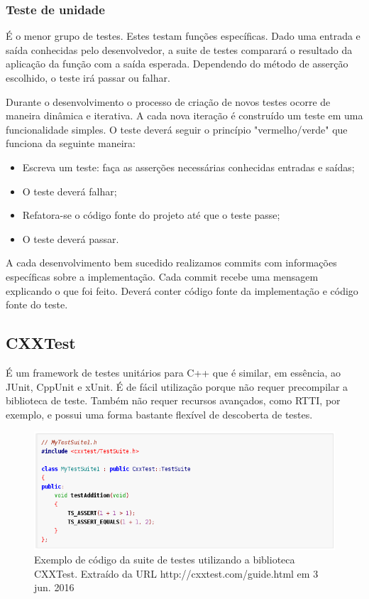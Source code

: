 \documentclass[
	article,			%
	12pt,				%
	oneside,			%
	a4paper,			%
	english,			
	brazil,
	sumario=tradicional
	]{abntex2}
\begin{document}
\subsubsection{Teste de unidade}

É o menor grupo de testes. Estes testam funções específicas. Dado uma entrada e saída conhecidas pelo desenvolvedor, a suite de testes comparará o resultado da aplicação da função com a saída esperada. Dependendo do método de asserção escolhido, o teste irá passar ou falhar.

Durante o desenvolvimento o processo de criação de novos testes ocorre de maneira dinâmica e iterativa. A cada nova iteração é construído um teste em uma funcionalidade simples. 
O teste deverá seguir o princípio "vermelho/verde" que funciona da seguinte maneira:
\begin{itemize}
	\item{Escreva um teste: faça as asserções necessárias conhecidas entradas e saídas;}
	\item{O teste deverá falhar;}	
	\item{Refatora-se o código fonte do projeto até que o teste passe;}
	\item{O teste deverá passar.}
\end{itemize}

A cada desenvolvimento bem sucedido realizamos commits com informações específicas sobre a implementação. Cada commit recebe uma mensagem explicando o que foi feito. Deverá conter código fonte da implementação e código fonte do teste.


\subsection{CXXTest}

É um framework de testes unitários para C++ que é similar, em essência, ao JUnit, CppUnit e xUnit. É de fácil utilização porque não requer precompilar a biblioteca de teste. Também não requer recursos avançados, como RTTI, por exemplo, e possui uma forma bastante flexível de descoberta de testes.


\begin{figure}[!h]
\centering
\includegraphics[scale=0.4]{images/cxxtest_simpletest.png}
\caption{Exemplo de código da suite de testes utilizando a biblioteca CXXTest. Extraído da URL http://cxxtest.com/guide.html em 3 jun. 2016}
\label{cxxtest_simpletest}
\end{figure}
\end{document}
